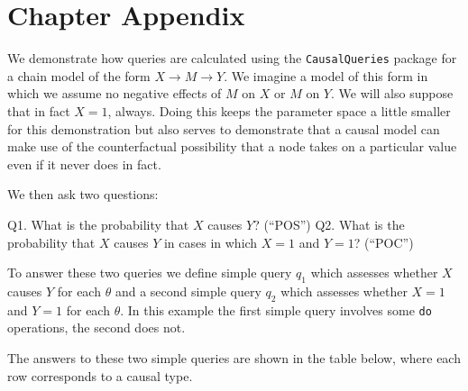 \documentclass[
  12pt,
]{book}
\newenvironment{Shaded}{\begin{snugshade}}{\end{snugshade}}
\newcommand{\AttributeTok}[1]{\textcolor[rgb]{0.00,0.34,0.68}{#1}}
\newcommand{\FunctionTok}[1]{\textcolor[rgb]{0.39,0.29,0.61}{#1}}
\newcommand{\NormalTok}[1]{\textcolor[rgb]{0.12,0.11,0.11}{#1}}
\newcommand{\OtherTok}[1]{\textcolor[rgb]{0.00,0.43,0.16}{#1}}
\newcommand{\SpecialCharTok}[1]{\textcolor[rgb]{0.24,0.68,0.91}{#1}}
\newcommand{\StringTok}[1]{\textcolor[rgb]{0.75,0.01,0.01}{#1}}
\begin{document}
\hypertarget{chapter-appendix-1}{%
\section{Chapter Appendix}\label{chapter-appendix-1}}

We demonstrate how queries are calculated using the \texttt{CausalQueries} package for a chain model of the form \(X \rightarrow M \rightarrow Y\). We imagine a model of this form in which we assume no negative effects of \(M\) on \(X\) or \(M\) on \(Y\). We will also suppose that in fact \(X=1\), always. Doing this keeps the parameter space a little smaller for this demonstration but also serves to demonstrate that a causal model can make use of the counterfactual possibility that a node takes on a particular value even if it never does in fact.

We then ask two questions:

Q1. What is the probability that \(X\) causes \(Y\)? (``POS'')
Q2. What is the probability that \(X\) causes \(Y\) in cases in which \(X=1\) and \(Y=1\)? (``POC'')

To answer these two queries we define simple query \(q_1\) which assesses whether \(X\) causes \(Y\) for each \(\theta\) and a second simple query \(q_2\) which assesses whether \(X=1\) and \(Y=1\) for each \(\theta\). In this example the first simple query involves some \texttt{do} operations, the second does not.

The answers to these two simple queries are shown in the table below, where each row corresponds to a causal type.

\begin{Shaded}
\end{Shaded}
\end{document}
